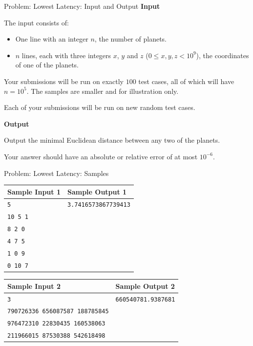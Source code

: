 \documentclass[11pt,pdf, aspectratio=169]{beamer}
\begin{document}
  \begin{frame}{Problem: Lowest Latency: Input and Output}
    \textbf{Input}

    The input consists of:
    \begin{itemize}
      \item One line with an integer $n$, the number of planets.
      \item $n$ lines, each with three integers $x$, $y$ and $z$
      ($0 \leq x, y, z < 10^9$), the coordinates of one of the planets.
    \end{itemize}
    Your submissions will be run on exactly $100$ test cases, all of which will have $n = 10^5$.
    The samples are smaller and for illustration only.

    Each of your submissions will be run on new random test cases.

    \textbf{Output}

    Output the minimal Euclidean distance between any two of the planets.

    Your answer should have an absolute or relative error of at most $10^{-6}$.
  \end{frame}
  \begin{frame}{Problem: Lowest Latency: Samples}
    \begin{tabular}{|l|l|}
      \hline
      \textbf{Sample Input 1} & \textbf{Sample Output 1}    \\
      \hline
      \texttt{5}              & \texttt{3.7416573867739413} \\
      \texttt{10 5 1}         &                             \\
      \texttt{8 2 0}          &                             \\
      \texttt{4 7 5}          &                             \\
      \texttt{1 0 9}          &                             \\
      \texttt{0 10 7}         &                             \\
      \hline
    \end{tabular}

    \begin{tabular}{|l|l|}
      \hline
      \textbf{Sample Input 2}                & \textbf{Sample Output 2}   \\
      \hline
      \texttt{3}                             & \texttt{660540781.9387681} \\
      \texttt{790726336 656087587 188785845} &                            \\
      \texttt{976472310 22830435 160538063}  &                            \\
      \texttt{211966015 87530388 542618498}  &                            \\
      \hline
    \end{tabular}

  \end{frame}
\end{document}
